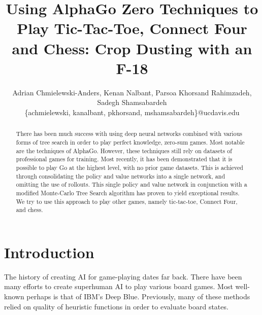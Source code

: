 \documentclass[english]{article}
\begin{document}


\title{\huge{Using AlphaGo Zero Techniques to Play Tic-Tac-Toe, Connect Four and Chess: Crop Dusting with an F-18}}
\author{
Adrian Chmielewski-Anders, Kenan Nalbant, Parsoa Khorsand Rahimzadeh, Sadegh Shamsabardeh \\
\{achmielewski, kanalbant, pkhorsand, mshamsabardeh\}@ucdavis.edu
}
\date{}

\maketitle


\begin{abstract}
There has been much success with using deep neural networks combined
with various forms of tree search in order to play perfect knowledge, zero-sum
games. Most notable are the techniques of AlphaGo. However,
these techniques still rely on datasets of professional games for training.
Most recently, it has been demonstrated that it is possible to play Go at
the highest level, with no prior game datasets.
This is achieved through consolidating the policy and value networks into a single
network, and omitting the use of rollouts. This single policy and value network
in conjunction with a modified Monte-Carlo Tree Search algorithm has proven to
yield exceptional results. We try to use this approach to play
other games, namely tic-tac-toe, Connect Four, and chess.

\end{abstract}
\section{Introduction}
The history of creating AI for game-playing dates far back. There have been many
efforts to create superhuman AI to play various board games. Most well-known
perhaps is that of IBM's Deep Blue. Previously, many of these methods relied on
quality of heuristic functions in order to evaluate board states.
\end{document}

